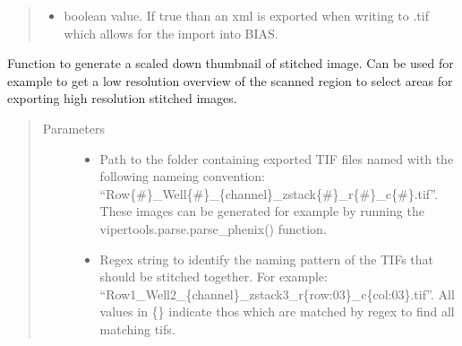 \documentclass[a4paper,10pt,english,openany,oneside]{sphinxmanual}
\begin{document}
\begin{fulllineitems}
\begin{quote}
\begin{description}
\begin{itemize}
\item {} 
\sphinxAtStartPar
{} \textendash{} boolean value. If true than an xml is exported when writing to .tif which allows for the import into BIAS.

\end{itemize}

\end{description}\end{quote}

\end{fulllineitems}


\begin{fulllineitems}
\label{\detokenize{pages/modules:vipertools.stitch.generate_thumbnail}}
\sphinxAtStartPar
Function to generate a scaled down thumbnail of stitched image. Can be used for example to
get a low resolution overview of the scanned region to select areas for exporting high resolution
stitched images.
\begin{quote}\begin{description}
\item[{Parameters}] \leavevmode\begin{itemize}
\item {} 
\sphinxAtStartPar
{} \textendash{} Path to the folder containing exported TIF files named with the following nameing convention: “Row\{\#\}\_Well\{\#\}\_\{channel\}\_zstack\{\#\}\_r\{\#\}\_c\{\#\}.tif”.
These images can be generated for example by running the vipertools.parse.parse\_phenix() function.

\item {} 
\sphinxAtStartPar
{} \textendash{} Regex string to identify the naming pattern of the TIFs that should be stitched together.
For example: “Row1\_Well2\_\{channel\}\_zstack3\_r\{row:03\}\_c\{col:03\}.tif”.
All values in \{\} indicate thos which are matched by regex to find all matching tifs.


\end{itemize}
\end{description}
\end{quote}
\end{fulllineitems}
\end{document}
